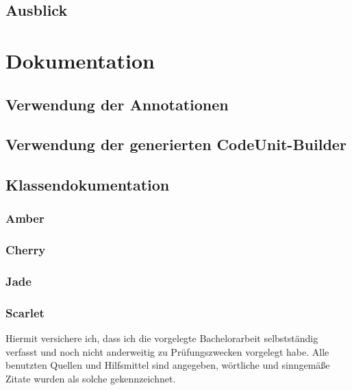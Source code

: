 \documentclass[12pt,oneside,a4paper,parskip]{scrbook}
\begin{document}
\section{Ausblick}

\appendix
\chapter{Dokumentation}
\section{Verwendung der Annotationen}
\section{Verwendung der generierten CodeUnit-Builder}
\section{Klassendokumentation}
\subsection{Amber}
\subsection{Cherry}
\subsection{Jade}
\subsection{Scarlet}


\backmatter

\listoffigures
{}

\listoftables


\printbibliography
{}



Hiermit versichere ich, dass ich die vorgelegte Bachelorarbeit selbstständig verfasst und noch nicht anderweitig zu Prüfungszwecken vorgelegt habe. Alle benutzten Quellen und Hilfsmittel sind angegeben, wörtliche und sinngemäße Zitate wurden als solche gekennzeichnet.
\end{document}
